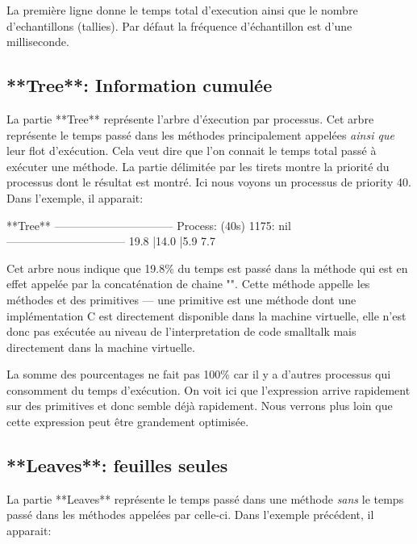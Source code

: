 \documentclass[a4paper,10pt,twoside]{book}
\begin{document}
La premi\`ere ligne donne le temps total d'execution ainsi que le
nombre d'echantillons (tallies). Par d\'efaut la fr\'equence
d'\'echantillon est d'une milliseconde. 

 \subsection{**Tree**: Information cumul\'ee}

 La partie **Tree** repr\'esente l'arbre d'\'execution par
 processus. Cet arbre repr\'esente le temps pass\'e dans les
 m\'ethodes principalement appel\'ees \emph{ainsi que} leur flot
 d'ex\'ecution. Cela veut dire que l'on connait le temps total pass\'e
 \`a ex\'ecuter une m\'ethode. La partie d\'elimit\'ee par les tirets
 montre la priorit\'e du processus dont le r\'esultat est
 montr\'e. Ici nous voyons un processus de priority 40.  Dans
 l'exemple, il apparait:

\begin{sf}
\begin{small}
**Tree**
--------------------------------
Process: (40s)  1175: nil
--------------------------------
19.8%
  |14.0%
  |5.9%
7.7%
\end{small}
\end{sf}


Cet arbre nous indique que 19.8\% du temps est pass\'e dans la m\'ethode
 qui est en effet
appel\'ee par la concat\'enation de chaine "\ct{,}". Cette m\'ethode
appelle les m\'ethodes  et des primitives  --- une primitive
est une m\'ethode dont une impl\'ementation C est directement
disponible dans la machine virtuelle, elle n'est donc pas ex\'ecut\'ee
au niveau de l'interpretation de code smalltalk mais directement dans
la machine virtuelle. 

La somme des pourcentages ne fait pas 100\% car il y a d'autres processus qui
consomment du temps d'ex\'ecution. On voit ici que l'expression arrive 
rapidement sur des primitives et donc semble d\'ej\`a rapidement. Nous
verrons plus loin que cette expression peut \^etre grandement
optimis\'ee. 



\subsection{**Leaves**: feuilles seules}
La partie **Leaves** repr\'esente le temps pass\'e dans une m\'ethode
\emph{sans} le temps pass\'e dans les m\'ethodes appel\'ees par
celle-ci. Dans l'exemple pr\'ec\'edent, il apparait:
\end{document}
